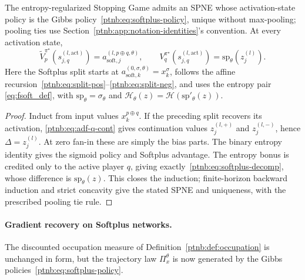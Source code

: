 \begin{theoremenv}\label{ptnb:thm:softplus-forward}\label{prop:softplus_game}
The entropy-regularized Stopping Game admits an SPNE whose activation-state policy is the Gibbs policy~\eqref{ptnb:eq:softplus-policy},
unique without max-pooling; pooling ties use Section~\ref{ptnb:app:notation-identities}'s convention.
At every activation state,
\begin{equation}\label{ptnb:eq:softplus-spne-tildes}
    \tilde V_p^{\pi^\star}(s_{j,q}^{(l,\mathrm{act})})
       =a_{\mathrm{soft},j}^{(l,p\oplus q,\theta)},\qquad
    V_q^{\pi^\star}(s_{j,q}^{(l,\mathrm{act})})=\mathrm{sp}_\theta(z_j^{(l)}).
\end{equation}
Here the Softplus split starts at $a_{\mathrm{soft},k}^{(0,\sigma,\theta)}=x_k^\sigma$, follows the affine
recursion~\eqref{ptnb:eq:split-pos}--\eqref{ptnb:eq:split-neg}, and uses the entropy pair
\eqref{eq:fsoft_def}, with $\mathrm{sp}_\theta=\sigma_\theta$ and
$\mathcal H_\theta(z)=\mathcal H(\mathrm{sp}'_\theta(z))$.
\end{theoremenv}
\begin{proof}
Induct from input values $x_k^{p\oplus q}$. If the preceding split recovers its activation,
\eqref{ptnb:eq:adf-q-cont} gives continuation values $z_j^{(l,+)}$ and $z_j^{(l,-)}$, hence
$\Delta=z_j^{(l)}$. At zero fan-in these are simply the bias parts. The binary entropy identity
gives the sigmoid policy and Softplus advantage. The entropy bonus is credited only to the active player $q$, giving exactly~\eqref{ptnb:eq:softplus-decomp}, whose difference is $\mathrm{sp}_\theta(z)$.
This closes the induction; finite-horizon backward induction and strict concavity give the stated
SPNE and uniqueness, with the prescribed pooling tie rule.
\end{proof}

\paragraph{Gradient recovery on Softplus networks.}\label{ptnb:app:softplus-gradient}
The discounted occupation measure of Definition~\ref{ptnb:def:occupation} is unchanged in form, but the
trajectory law $\Pi_x^\theta$ is now generated by the Gibbs policies~\eqref{ptnb:eq:softplus-policy}.


